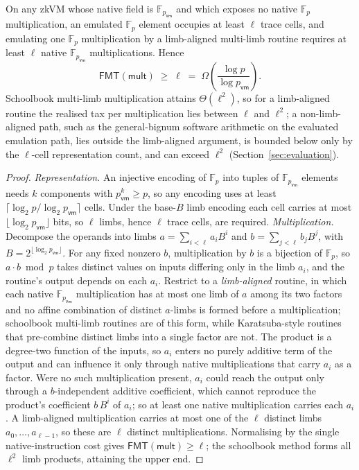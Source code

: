 \begin{proposition}\label{prop:fmt-lb}
On any zkVM whose native field is $\mathbb{F}_{p_{\mathsf{vm}}}$ and which exposes no native $\mathbb{F}_p$ multiplication, an emulated $\mathbb{F}_p$ element occupies at least $\ell$ trace cells, and emulating one $\mathbb{F}_p$ multiplication by a limb-aligned multi-limb routine requires at least $\ell$ native $\mathbb{F}_{p_{\mathsf{vm}}}$ multiplications. Hence
\begin{equation*}
  \mathsf{FMT}(\mathsf{mult}) \;\ge\; \ell \;=\; \Omega\!\left(\frac{\log p}{\log p_{\mathsf{vm}}}\right).
\end{equation*}
Schoolbook multi-limb multiplication attains $\Theta(\ell^2)$, so for a limb-aligned routine the realised tax per multiplication lies between $\ell$ and $\ell^2$; a non-limb-aligned path, such as the general-bignum software arithmetic on the evaluated emulation path, lies outside the limb-aligned argument, is bounded below only by the $\ell$-cell representation count, and can exceed $\ell^2$ (Section~\ref{sec:evaluation}).
\end{proposition}

\begin{proof}
\emph{Representation.} An injective encoding of $\mathbb{F}_p$ into tuples of $\mathbb{F}_{p_{\mathsf{vm}}}$ elements needs $k$ components with $p_{\mathsf{vm}}^{k}\ge p$, so any encoding uses at least $\lceil\log_2 p/\log_2 p_{\mathsf{vm}}\rceil$ cells. Under the base-$B$ limb encoding each cell carries at most $\lfloor\log_2 p_{\mathsf{vm}}\rfloor$ bits, so $\ell$ limbs, hence $\ell$ trace cells, are required. \emph{Multiplication.} Decompose the operands into limbs $a=\sum_{i<\ell}a_i B^i$ and $b=\sum_{j<\ell}b_j B^j$, with $B=2^{\lfloor\log_2 p_{\mathsf{vm}}\rfloor}$. For any fixed nonzero $b$, multiplication by $b$ is a bijection of $\mathbb{F}_p$, so $a\cdot b\bmod p$ takes distinct values on inputs differing only in the limb $a_i$, and the routine's output depends on each $a_i$. Restrict to a \emph{limb-aligned} routine, in which each native $\mathbb{F}_{p_{\mathsf{vm}}}$ multiplication has at most one limb of $a$ among its two factors and no affine combination of distinct $a$-limbs is formed before a multiplication; schoolbook multi-limb routines are of this form, while Karatsuba-style routines that pre-combine distinct limbs into a single factor are not. The product is a degree-two function of the inputs, so $a_i$ enters no purely additive term of the output and can influence it only through native multiplications that carry $a_i$ as a factor. Were no such multiplication present, $a_i$ could reach the output only through a $b$-independent additive coefficient, which cannot reproduce the product's coefficient $b\,B^i$ of $a_i$; so at least one native multiplication carries each $a_i$. A limb-aligned multiplication carries at most one of the $\ell$ distinct limbs $a_0,\dots,a_{\ell-1}$, so these are $\ell$ distinct multiplications. Normalising by the single native-instruction cost gives $\mathsf{FMT}(\mathsf{mult})\ge\ell$; the schoolbook method forms all $\ell^2$ limb products, attaining the upper end.
\end{proof}

